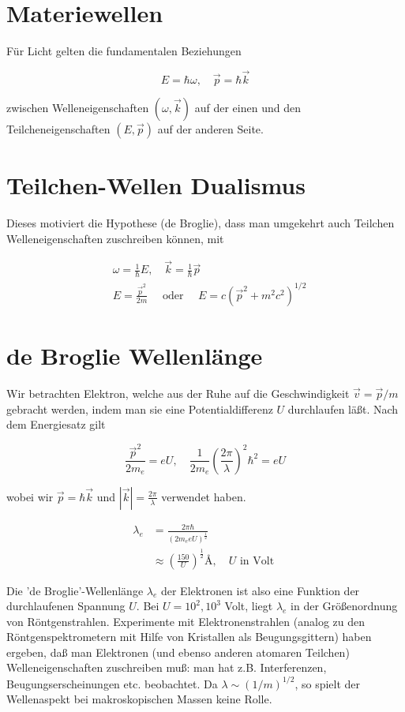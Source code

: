 \documentclass[10pt, letterpaper]{article}
\begin{document}
\section*{Materiewellen}
Für Licht gelten die fundamentalen Beziehungen

$$
E=\hbar \omega, \quad \vec{p}=\hbar \vec{k}
$$

zwischen Welleneigenschaften $(\omega, \vec{k})$ auf der einen und den Teilcheneigenschaften $(E, \vec{p})$ auf der anderen Seite.

\section*{Teilchen-Wellen Dualismus}
Dieses motiviert die Hypothese (de Broglie), dass man umgekehrt auch Teilchen Welleneigenschaften zuschreiben können, mit

$$
\begin{aligned}
& \omega=\frac{1}{\hbar} E, \quad \vec{k}=\frac{1}{\hbar} \vec{p} \\
& E=\frac{\vec{p}^{2}}{2 m} \quad \text { oder } \quad E=c\left(\vec{p}^{2}+m^{2} c^{2}\right)^{1 / 2}
\end{aligned}
$$

\section*{de Broglie Wellenlänge}
Wir betrachten Elektron, welche aus der Ruhe auf die Geschwindigkeit $\vec{v}=\vec{p} / m$ gebracht werden, indem man sie eine Potentialdifferenz $U$ durchlaufen läßt. Nach dem Energiesatz gilt

$$
\frac{\vec{p}^{2}}{2 m_{e}}=e U, \quad \frac{1}{2 m_{e}}\left(\frac{2 \pi}{\lambda}\right)^{2} \hbar^{2}=e U
$$

wobei wir $\vec{p}=\hbar \vec{k}$ und $|\vec{k}|=\frac{2 \pi}{\lambda}$ verwendet haben.

$$
\begin{aligned}
\lambda_{e} & =\frac{2 \pi \hbar}{\left(2 m_{e} e U\right)^{\frac{1}{2}}} \\
& \approx\left(\frac{150}{U}\right)^{\frac{1}{2}} \text{\AA}, \quad U \text { in Volt }
\end{aligned}
$$

Die 'de Broglie'-Wellenlänge $\lambda_{e}$ der Elektronen ist also eine Funktion der durchlaufenen Spannung $U$. Bei $U=10^{2}, 10^{3}$ Volt, liegt $\lambda_{e}$ in der Größenordnung von Röntgenstrahlen. Experimente mit Elektronenstrahlen (analog zu den Röntgenspektrometern mit Hilfe von Kristallen als Beugungsgittern) haben ergeben, daß man Elektronen (und ebenso anderen atomaren Teilchen) Welleneigenschaften zuschreiben muß: man hat z.B. Interferenzen, Beugungserscheinungen etc. beobachtet. Da $\lambda \sim(1 / m)^{1 / 2}$, so spielt der Wellenaspekt bei makroskopischen Massen keine Rolle.
\end{document}
